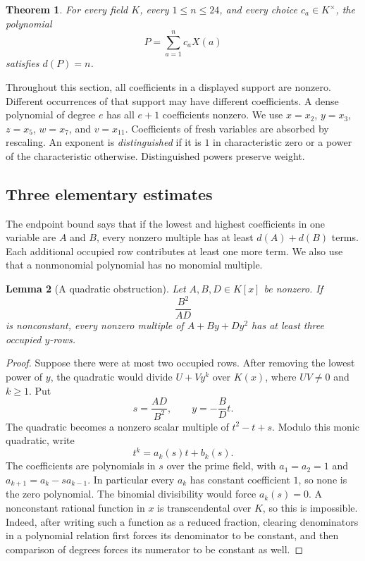 \documentclass[11pt]{article}
\numberwithin{equation}{section}
\newtheorem{theorem}{Theorem}[section]
\newtheorem{lemma}[theorem]{Lemma}
\theoremstyle{definition}\newtheorem{definition}[theorem]{Definition}
\theoremstyle{remark}\newtheorem{remark}[theorem]{Remark}
\begin{document}
\begin{theorem}\label{thm:initial}
For every field $K$, every $1\le n\le24$, and every choice
$c_a\in K^\times$, the polynomial
\[
 P=\sum_{a=1}^n c_aX(a)
\]
satisfies $d(P)=n$.
\end{theorem}

Throughout this section, all coefficients in a displayed support are
nonzero. Different occurrences of that support may have different
coefficients. A dense polynomial of degree $e$ has all $e+1$
coefficients nonzero. We use $x=x_2$, $y=x_3$, $z=x_5$, $w=x_7$,
and $v=x_{11}$. Coefficients of fresh variables are absorbed by rescaling.
An exponent is \emph{distinguished} if it is $1$ in characteristic zero
or a power of the characteristic otherwise. Distinguished powers preserve
weight.

\subsection{Three elementary estimates}

The endpoint bound says that if the lowest and highest coefficients in
one variable are $A$ and $B$, every nonzero multiple has at least
$d(A)+d(B)$ terms. Each additional occupied row contributes at least one
more term. We also use that a nonmonomial polynomial has no monomial
multiple.

\begin{lemma}[A quadratic obstruction]\label{lem:initial-quadratic}
Let $A,B,D\in K[x]$ be nonzero.  If
\[
 \frac{B^2}{AD}
\]
is nonconstant, every nonzero multiple of $A+By+Dy^2$ has at least three
occupied $y$-rows.
\end{lemma}
\begin{proof}
Suppose there were at most two occupied rows. After removing the
lowest power of $y$, the quadratic would divide $U+Vy^k$ over $K(x)$,
where $UV\ne0$ and $k\ge1$. Put
\[
 s=\frac{AD}{B^2},\qquad y=-\frac BD t.
\]
The quadratic becomes a nonzero scalar multiple of $t^2-t+s$.
Modulo this monic quadratic, write
\[
 t^k=a_k(s)t+b_k(s).
\]
The coefficients are polynomials in $s$ over the prime field, with
$a_1=a_2=1$ and $a_{k+1}=a_k-sa_{k-1}$. In particular every $a_k$
has constant coefficient $1$, so none is the zero polynomial.
The binomial divisibility would force $a_k(s)=0$. A nonconstant
rational function in $x$ is transcendental over $K$, so this is
impossible. Indeed, after writing such a function as a reduced
fraction, clearing denominators in a polynomial relation first
forces its denominator to be constant, and then comparison of
degrees forces its numerator to be constant as well.
\end{proof}
\end{document}
